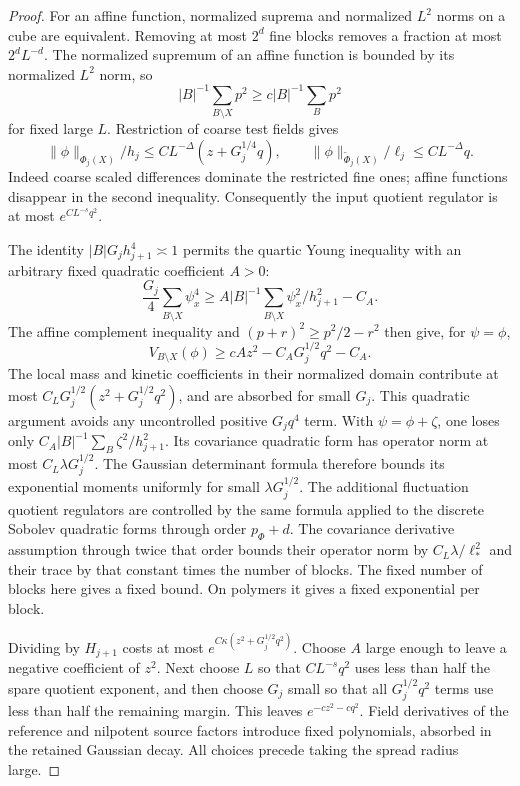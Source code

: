\documentclass[11pt]{article}
\begin{document}
\begin{proof}
For an affine function, normalized suprema and normalized \(L^2\)
norms on a cube are equivalent. Removing at most \(2^d\) fine blocks
removes a fraction at most \(2^dL^{-d}\). The normalized supremum of
an affine function is bounded by its normalized \(L^2\) norm, so
\[
 |B|^{-1}\sum_{B\setminus X}p^2\ge c|B|^{-1}\sum_Bp^2
\]
for fixed large \(L\). Restriction of coarse test fields gives
\[
 \|\phi\|_{\Phi_j(X)}/h_j
 \le C L^{-\Delta}(z+G_j^{1/4}q),\qquad
 \|\phi\|_{\widetilde\Phi_j(X)}/\ell_j
 \le C L^{-\Delta}q.
\]
Indeed coarse scaled differences dominate the restricted fine ones;
affine functions disappear in the second inequality. Consequently the
input quotient regulator is at most \(e^{CL^{-s}q^2}\).

The identity \(|B|G_jh_{j+1}^4\asymp1\) permits the quartic Young
inequality with an arbitrary fixed quadratic coefficient \(A>0\):
\[
 \frac{G_j}{4}\sum_{B\setminus X}\psi_x^4
 \ge A|B|^{-1}\sum_{B\setminus X}\psi_x^2/h_{j+1}^2-C_A.
\]
The affine complement inequality and \((p+r)^2\ge p^2/2-r^2\)
then give, for \(\psi=\phi\),
\[
 V_{B\setminus X}(\phi)
       \ge cA z^2-C_A G_j^{1/2}q^2-C_A.
\]
The local mass and kinetic coefficients in their normalized domain
contribute at most \(C_LG_j^{1/2}(z^2+G_j^{1/2}q^2)\), and are
absorbed for small \(G_j\). This quadratic argument avoids any
uncontrolled positive \(G_jq^4\) term.
With \(\psi=\phi+\zeta\), one loses only
\(C_A|B|^{-1}\sum_B\zeta^2/h_{j+1}^2\). Its covariance quadratic
form has operator norm at most \(C_L\lambda G_j^{1/2}\).
The Gaussian determinant formula therefore bounds its exponential
moments uniformly for small \(\lambda G_j^{1/2}\).
The additional fluctuation quotient regulators are controlled by the
same formula applied to the discrete Sobolev quadratic forms through
order \(p_\Phi+d\). The covariance derivative assumption through twice
that order bounds their operator norm by \(C_L\lambda/\ell_*^2\)
and their trace by that constant times the number of blocks. The fixed
number of blocks here gives a fixed bound. On polymers it gives a fixed
exponential per block.

Dividing by \(H_{j+1}\) costs at most
\(e^{C\kappa(z^2+G_j^{1/2}q^2)}\). Choose \(A\) large enough to
leave a negative coefficient of \(z^2\). Next choose \(L\) so that
\(CL^{-s}q^2\) uses less than half the spare quotient exponent, and
then choose \(G_j\) small so that all \(G_j^{1/2}q^2\) terms use less
than half the remaining margin. This leaves
\(e^{-cz^2-cq^2}\). Field derivatives of the reference and nilpotent
source factors introduce fixed polynomials, absorbed in the retained
Gaussian decay. All choices precede taking the spread radius large.
\end{proof}
\end{document}
